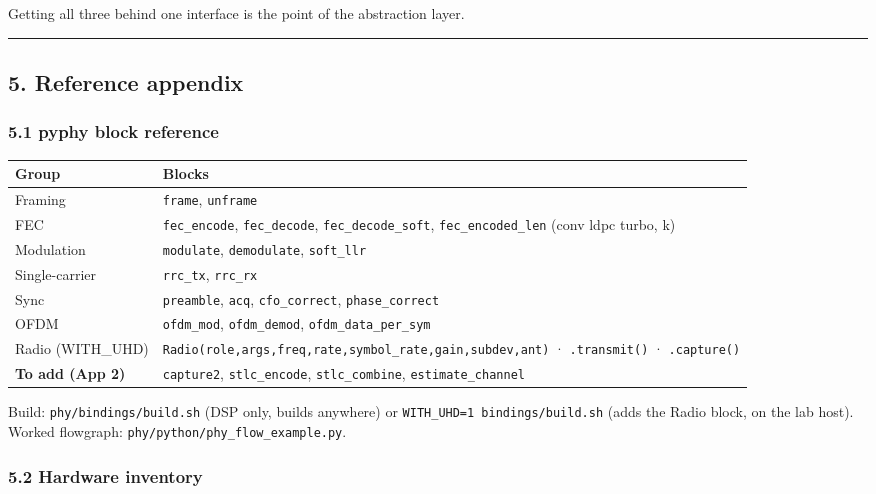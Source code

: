\documentclass[
  10pt,
]{article}
\begin{document}
Getting all three behind one interface is the point of the abstraction
layer.

\begin{center}\rule{0.5\linewidth}{0.5pt}\end{center}

\hypertarget{5-reference-appendix}{%
\subsection{5. Reference appendix}\label{5-reference-appendix}}

\hypertarget{51-pyphy-block-reference}{%
\subsubsection{5.1 pyphy block
reference}\label{51-pyphy-block-reference}}

\begin{longtable}[]{@{}ll@{}}
\toprule
Group & Blocks \\
\midrule
\endhead
Framing & \texttt{frame}, \texttt{unframe} \\
FEC & \texttt{fec\_encode}, \texttt{fec\_decode},
\texttt{fec\_decode\_soft}, \texttt{fec\_encoded\_len} (conv \textbar{}
ldpc \textbar{} turbo, k) \\
Modulation & \texttt{modulate}, \texttt{demodulate},
\texttt{soft\_llr} \\
Single-carrier & \texttt{rrc\_tx}, \texttt{rrc\_rx} \\
Sync & \texttt{preamble}, \texttt{acq}, \texttt{cfo\_correct},
\texttt{phase\_correct} \\
OFDM & \texttt{ofdm\_mod}, \texttt{ofdm\_demod},
\texttt{ofdm\_data\_per\_sym} \\
Radio (WITH\_UHD) &
\texttt{Radio(role,args,freq,rate,symbol\_rate,gain,subdev,ant)} ·
\texttt{.transmit()} · \texttt{.capture()} \\
\textbf{To add (App 2)} & \texttt{capture2}, \texttt{stlc\_encode},
\texttt{stlc\_combine}, \texttt{estimate\_channel} \\
\bottomrule
\end{longtable}

Build: \texttt{phy/bindings/build.sh} (DSP only, builds anywhere) or
\texttt{WITH\_UHD=1\ bindings/build.sh} (adds the Radio block, on the
lab host). Worked flowgraph: \texttt{phy/python/phy\_flow\_example.py}.

\hypertarget{52-hardware-inventory}{%
\subsubsection{5.2 Hardware inventory}\label{52-hardware-inventory}}
\end{document}
